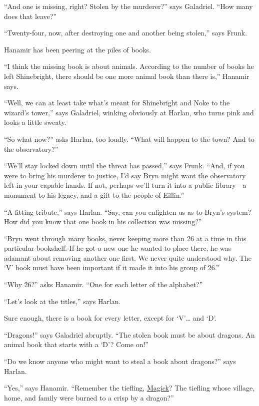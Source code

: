 \documentclass[smalldemyvopaper,11pt,twoside,onecolumn,openright,extrafontsizes]{memoir}
\begin{document}
``And one is missing, right? Stolen by the murderer?'' says Galadriel.
``How many does that leave?''

``Twenty-four, now, after destroying one and another being stolen,''
says Frunk.

Hanamir has been peering at the piles of books.

``I think the missing book is about animals. According to the number of
books he left Shinebright, there should be one more animal book than
there is,'' Hanamir says.

``Well, we can at least take what's meant for Shinebright and Noke to
the wizard's tower,'' says Galadriel, winking obviously at Harlan, who
turns pink and looks a little sweaty.

``So what now?'' asks Harlan, too loudly. ``What will happen to the
town? And to the observatory?''

``We'll stay locked down until the threat has passed,'' says Frunk.
``And, if you were to bring his murderer to justice, I'd say Bryn might
want the observatory left in your capable hands. If not, perhaps we'll
turn it into a public library---a monument to his legacy, and a gift to
the people of Eillin.''

``A fitting tribute,'' says Harlan. ``Say, can you enlighten us as to
Bryn's system? How did you know that one book in his collection was
missing?''

``Bryn went through many books, never keeping more than 26 at a time in
this particular bookshelf. If he got a new one he wanted to place there,
he was adamant about removing another one first. We never quite
understood why. The `V' book must have been important if it made it into
his group of 26.''

``Why 26?'' asks Hanamir. ``One for each letter of the alphabet?''

``Let's look at the titles,'' says Harlan.

Sure enough, there is a book for every letter, except for `V'\ldots{}
and `D'.

``Dragons!'' says Galadriel abruptly. ``The stolen book must be about
dragons. An animal book that starts with a `D'? Come on!''

``Do we know anyone who might want to steal a book about dragons?'' says
Harlan.

``Yes,'' says Hanamir. ``Remember the tiefling,
\href{/characters/magick/}{Magick}? The tiefling whose village, home,
and family were burned to a crisp by a dragon?''
\end{document}
